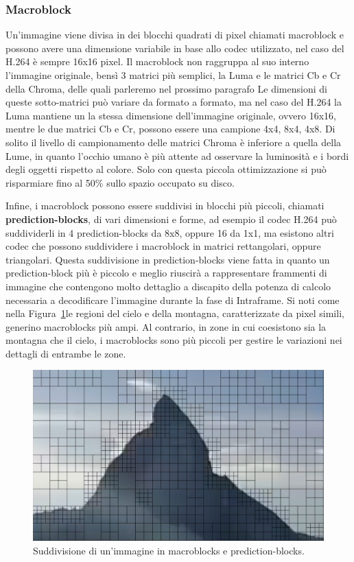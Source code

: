 \documentclass[a4paper,12pt, oneside]{article}
\begin{document}
\subsubsection{Macroblock}
Un'immagine viene divisa in dei blocchi quadrati di pixel chiamati macroblock e possono avere una
dimensione variabile in base allo codec utilizzato, nel caso del H.264 è sempre 16x16 pixel. Il
macroblock non raggruppa al suo interno l'immagine originale, bensì 3 matrici più semplici, la
Luma e le matrici Cb e Cr della Chroma, delle quali parleremo nel prossimo paragrafo Le dimensioni di
queste sotto-matrici può variare da
formato a formato, ma nel caso del H.264 la Luma mantiene un la stessa dimensione dell'immagine
originale, ovvero 16x16, mentre le due matrici Cb e Cr, possono essere una campione 4x4, 8x4, 4x8.
Di solito il livello di campionamento delle matrici Chroma è inferiore a quella della Lume, in quanto
l'occhio umano è più attente ad osservare la luminosità e i bordi degli oggetti rispetto al colore.
Solo con questa piccola ottimizzazione si può risparmiare fino al 50\% sullo spazio occupato su disco.

Infine, i macroblock possono essere suddivisi in blocchi più piccoli, chiamati
\textbf{prediction-blocks}, di vari dimensioni e forme, ad esempio il codec H.264 può suddividerli in
4 prediction-blocks da 8x8, oppure 16 da 1x1, ma esistono altri codec che possono suddividere i
macroblock in matrici rettangolari, oppure triangolari. Questa suddivisione in prediction-blocks
viene fatta in quanto un prediction-block più è piccolo e meglio riuscirà a rappresentare frammenti
di immagine che contengono molto dettaglio a discapito della potenza di calcolo necessaria a
decodificare l'immagine durante la fase di Intraframe. Si noti come nella
Figura~\ref{fig:macroblocks_sub_division}le regioni del cielo e della montagna, caratterizzate da
pixel simili, generino macroblocks più ampi. Al contrario, in zone in cui coesistono sia la montagna
che il cielo, i macroblocks sono più piccoli per gestire le variazioni nei dettagli di entrambe le
zone.

\begin{figure}[h]
    \centering
    \includegraphics[width=1\textwidth]{images/macroblocks_sub-division.png}
    \caption{Suddivisione di un'immagine in macroblocks e prediction-blocks.}
    \label{fig:macroblocks_sub_division}
\end{figure}
\end{document}
